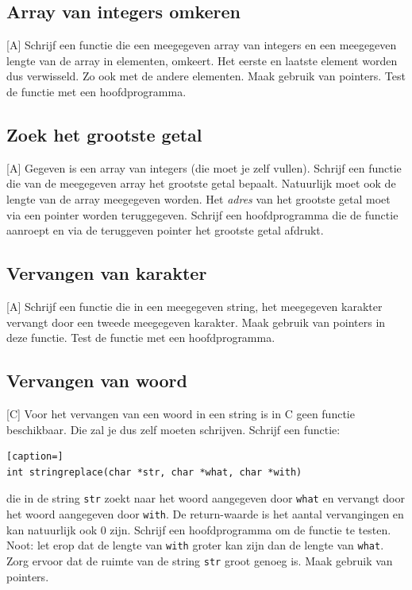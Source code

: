 \documentclass[a4paper,10pt,fleqn,twoside]{article}
\begin{document}
\subsection{Array van integers omkeren}[A]
Schrijf een functie die een meegegeven array van integers en een meegegeven lengte van de array in elementen, omkeert. Het eerste en laatste element worden dus verwisseld. Zo ook met de andere elementen. Maak gebruik van pointers. Test de functie met een hoofdprogramma.

\subsection{Zoek het grootste getal}[A]
Gegeven is een array van integers (die moet je zelf vullen). Schrijf een functie die van de meegegeven array het grootste getal bepaalt. Natuurlijk moet ook de lengte van de array meegegeven worden. Het \textsl{adres} van het grootste getal moet via een pointer worden teruggegeven. Schrijf een hoofdprogramma die de functie aanroept en via de teruggeven pointer het grootste getal afdrukt.

\subsection{Vervangen van karakter}[A]
Schrijf een functie die in een meegegeven string, het meegegeven karakter vervangt door een tweede meegegeven karakter. Maak gebruik van pointers in deze functie. Test de functie met een hoofdprogramma.

\subsection{Vervangen van woord}[C]
Voor het vervangen van een woord in een string is in C geen functie beschikbaar. Die zal je dus zelf moeten schrijven. Schrijf een functie:

\begin{lstlisting}[caption=]
int stringreplace(char *str, char *what, char *with)
\end{lstlisting}

die in de string \lstinline|str| zoekt naar het woord aangegeven door \lstinline|what| en vervangt door het woord aangegeven door \lstinline|with|. De return-waarde is het aantal vervangingen en kan natuurlijk ook 0 zijn. Schrijf een hoofdprogramma om de functie te testen. Noot: let erop dat de lengte van \lstinline|with| groter kan zijn dan de lengte van \lstinline|what|. Zorg ervoor dat de ruimte van de string \lstinline|str| groot genoeg is. Maak gebruik van pointers.
\end{document}
